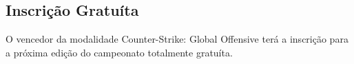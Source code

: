 \subsection{Inscrição Gratuíta}

O vencedor da modalidade Counter-Strike: Global Offensive terá a inscrição para a próxima edição do campeonato totalmente gratuíta.
